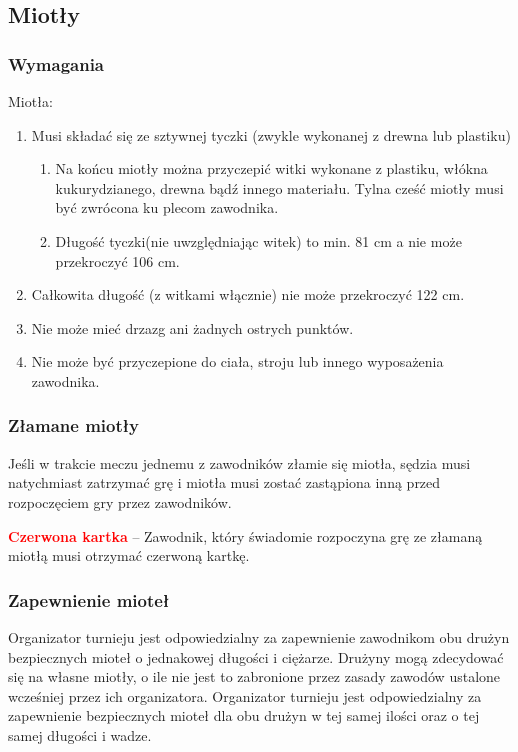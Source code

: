 \documentclass[12pt]{article}
\newcommand\redcard[1]{\bgroup\textcolor{red}{\textbf{#1}}}
\begin{document}
\subsection{Miotły}

\subsubsection{Wymagania}
Miotła:

\begin{enumerate}
	\item
	      Musi składać się ze sztywnej tyczki (zwykle wykonanej z drewna lub
	      plastiku)

	      \begin{enumerate}
		      \item
		            Na końcu miotły można przyczepić witki wykonane z plastiku, włókna
		            kukurydzianego, drewna bądź innego materiału. Tylna cześć miotły
		            musi być zwrócona ku plecom zawodnika.
		      \item
		            Długość tyczki(nie uwzględniając witek) to min. 81 cm a nie może
		            przekroczyć 106 cm.
	      \end{enumerate}
	\item
	      Całkowita długość (z witkami włącznie) nie może przekroczyć 122 cm.
	\item
	      Nie może mieć drzazg ani żadnych ostrych punktów.
	\item
	      Nie może być przyczepione do ciała, stroju lub innego wyposażenia
	      zawodnika.
\end{enumerate}

\subsubsection{Złamane miotły}
Jeśli w trakcie meczu jednemu z
zawodników złamie się miotła, sędzia musi natychmiast zatrzymać grę i
miotła musi zostać zastąpiona inną przed rozpoczęciem gry przez
zawodników.

\redcard{Czerwona kartka} -- Zawodnik, który świadomie rozpoczyna grę ze
złamaną miotłą musi otrzymać czerwoną kartkę.

\subsubsection{Zapewnienie mioteł}
Organizator turnieju jest odpowiedzialny za zapewnienie zawodnikom obu
drużyn bezpiecznych mioteł o jednakowej długości i ciężarze. Drużyny
mogą zdecydować się na własne miotły, o ile nie jest to zabronione przez
zasady zawodów ustalone wcześniej przez ich organizatora. Organizator
turnieju jest odpowiedzialny za zapewnienie bezpiecznych mioteł dla obu
drużyn w tej samej ilości oraz o tej samej długości i wadze.
\end{document}
